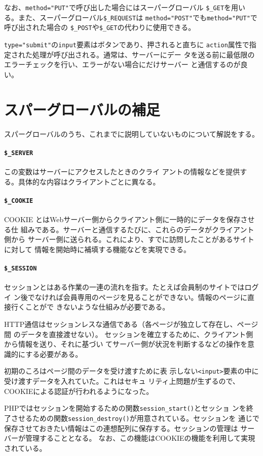 なお、\Verb+method="PUT"+で呼び出した場合にはスーパーグローバル
\Verb+$_GET+を用いる。また、スーパーグローバル\Verb+$_REQUEST+は
\Verb+method="POST"+でも\Verb+method="PUT"+で呼び出された場合の
\Verb+$_POST+や\Verb+$_GET+の代わりに使用できる。

\Verb+type="submit"+の\texttt{input}要素はボタンであり、押されると直ちに
\texttt{action}属性で指定された処理が呼び出される。通常は、サーバーにデー
タを送る前に最低限のエラーチェックを行い、エラーがない場合にだけサーバー
と通信するのが良い。

\section{スパーグローバルの補足}
スパーグローバルのうち、これまでに説明していないものについて解説をする。
\paragraph{\texttt{\$\_SERVER}}
この変数はサーバーにアクセスしたときのクライ
アントの情報などを提供する。具体的な内容はクライアントごとに異なる。

\paragraph{\texttt{\$\_COOKIE}}
COOKIE とはWebサーバー側からクライアント側に一時的にデータを保存させる仕
組みである。サーバーと通信するたびに、これらのデータがクライアント側から
サーバー側に送られる。これにより、すでに訪問したことがあるサイトに対して
情報を開始時に補填する機能などを実現できる。
\paragraph{\texttt{\$\_SESSION}}
セッションとはある作業の一連の流れを指す。たとえば会員制のサイトではログイ
ン後でなければ会員専用のページを見ることができない。情報のページに直接行くことがで
きないような仕組みが必要である。

HTTP通信はセッションレスな通信である（各ページが独立して存在し、ページ間
のデータを直接渡せない）。
セッションを確立するために、クライアント側から情報を送り、それに基づい
てサーバー側が状況を判断するなどの操作を意識的にする必要がある。

初期のころはページ間のデータを受け渡すために表
示しない\texttt{<input>}要素の中に受け渡すデータを入れていた。これはセキュ
リティ上問題が生ずるので、COOKIEによる認証が行われるようになった。

PHPではセッションを開始するための関数\texttt{session\_start()}とセッショ
ンを終了させるための関数\texttt{session\_destroy()}が用意されている。セッションを
通じで保存させておきたい情報はこの連想配列に保存する。セッションの管理は
サーバーが管理することとなる。
なお、この機能はCOOKIEの機能を利用して実現されている。
